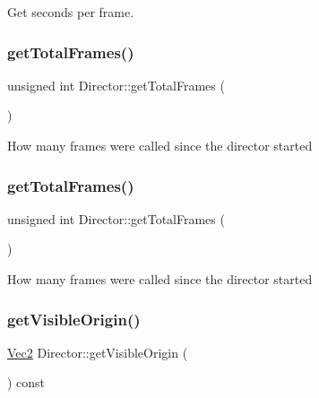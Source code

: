 Get seconds per frame. \mbox{\label{classDirector_a2876d2ae1cc0b6832620f1144c38142a}} 
\subsubsection{\texorpdfstring{get\+Total\+Frames()}{getTotalFrames()}\hspace{0.1cm}{\footnotesize\ttfamily [1/2]}}
{\footnotesize\ttfamily unsigned int Director\+::get\+Total\+Frames (\begin{DoxyParamCaption}{ }\end{DoxyParamCaption})\hspace{0.3cm}{\ttfamily [inline]}}

How many frames were called since the director started \mbox{\label{classDirector_a2876d2ae1cc0b6832620f1144c38142a}} 
\subsubsection{\texorpdfstring{get\+Total\+Frames()}{getTotalFrames()}\hspace{0.1cm}{\footnotesize\ttfamily [2/2]}}
{\footnotesize\ttfamily unsigned int Director\+::get\+Total\+Frames (\begin{DoxyParamCaption}{ }\end{DoxyParamCaption})\hspace{0.3cm}{\ttfamily [inline]}}

How many frames were called since the director started \mbox{\label{classDirector_a712d994af29f122e1b6496dd671718d5}} 
\subsubsection{\texorpdfstring{get\+Visible\+Origin()}{getVisibleOrigin()}\hspace{0.1cm}{\footnotesize\ttfamily [1/2]}}
{\footnotesize\ttfamily \hyperlink{classVec2}{Vec2} Director\+::get\+Visible\+Origin (\begin{DoxyParamCaption}{ }\end{DoxyParamCaption}) const}

